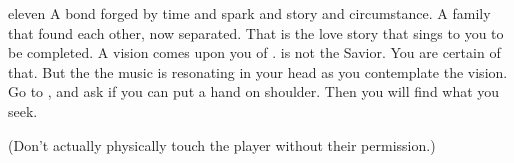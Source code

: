 \documentclass[greennotebook]{Silversiders} %
\begin{document}
\begin{page}{eleven}
A bond forged by time and spark and story and circumstance. A family that found each other, now separated. That is the love story that sings to you to be completed. A vision comes upon you of \cOutcast{\intro}. \cOutcast{\They} is not the Savior. You are certain of that. But the the music is resonating in your head as you contemplate the vision. Go to \cOutcast{}, and ask if you can put a hand on \cOutcast{\their} shoulder. Then you will find what you seek.

(Don't actually physically touch the player without their permission.)
\end{page}

\endnotebook
\end{document}
